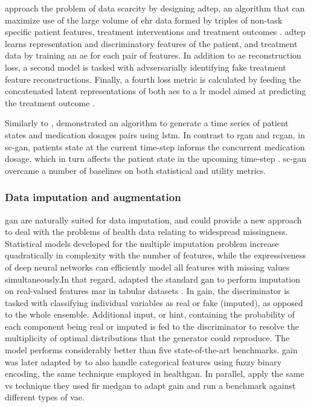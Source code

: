         \citeauthor{chu2019treatment} approach the problem of data scarcity by designing \gls{adtep}, an algorithm that can maximize use of the large volume of \gls{ehr} data formed by triples of non-task specific patient features, treatment interventions and treatment outcomes \cite{chu2019treatment}. \gls{adtep} learns representation and discriminatory features of the patient, and treatment data by training an \gls{ae} for each pair of features. In addition to \gls{ae} reconstruction loss, a second model is tasked with advsersarially identifying fake treatment feature reconstructions. Finally, a fourth loss metric is calculated by feeding the concatenated latent representations of both \glspl{ae} to a \gls{lr} model aimed at predicting the treatment outcome \cite{chu2019treatment}.\par
    
        Similarly to \citeauthor{esteban2017real}, \citeauthor{Wang_2019} demonstrated an algorithm to generate a time series of patient states and medication dosages pairs using \gls{lstm}. In contrast to \gls{rgan} and \gls{rcgan}, in \gls{sc-gan}, patients state at the current time-step informs the concurrent medication dosage, which in turn affects the patient state in the upcoming time-step \cite{Wang_2019}. \gls{sc-gan} overcame a number of baselines on both statistical and utility metrics.
    
    \subsubsection{Data imputation and augmentation}
    
        \gls{gan} are naturally suited for data imputation, and could provide a new approach to deal with the problems of health data relating to widespread missingness. Statistical models developed for the multiple imputation problem increase quadratically in complexity with the number of features, while the expressiveness of deep neural networks can efficiently model all features with missing values simultaneously.In that regard, \citeauthor{yoon2018imputation} adapted the standard \gls{gan} to perform imputation on real-valued features \gls{mar} in tabular datasets \cite{yoon2018imputation}. In \gls{gain}, the discriminator is tasked with classifying individual variables as real or fake (imputed), as opposed to the whole ensemble. Additional input, or hint, containing the probability of each component being real or imputed is fed to the discriminator to resolve the multiplicity of optimal distributions that the generator could reproduce. The model performs considerably better than five state-of-the-art benchmarks. \gls{gain} was later adapted by \citeauthor{Yang_2019_impute_ehr} to also handle categorical features using fuzzy binary encoding, the same technique employed in \gls{healthgan}. In parallel, \citeauthor{Camino2019} apply the same \gls{vs} technique they used fir \gls{medgan} to adapt \gls{gain} and run a benchmark against different types of \gls{vae}.\par
    
